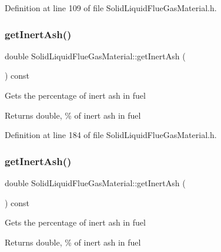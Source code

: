 Definition at line 109 of file Solid\+Liquid\+Flue\+Gas\+Material.\+h.

\mbox{\label{class_solid_liquid_flue_gas_material_a0549b32b7b5423267d5f59cc96b98127}} 
\subsubsection{\texorpdfstring{get\+Inert\+Ash()}{getInertAsh()}\hspace{0.1cm}{\footnotesize\ttfamily [1/3]}}
{\footnotesize\ttfamily double Solid\+Liquid\+Flue\+Gas\+Material\+::get\+Inert\+Ash (\begin{DoxyParamCaption}{ }\end{DoxyParamCaption}) const\hspace{0.3cm}{\ttfamily [inline]}}

Gets the percentage of inert ash in fuel \begin{DoxyReturn}{Returns}
double, \% of inert ash in fuel 
\end{DoxyReturn}


Definition at line 184 of file Solid\+Liquid\+Flue\+Gas\+Material.\+h.

\mbox{\label{class_solid_liquid_flue_gas_material_a0549b32b7b5423267d5f59cc96b98127}} 
\subsubsection{\texorpdfstring{get\+Inert\+Ash()}{getInertAsh()}\hspace{0.1cm}{\footnotesize\ttfamily [2/3]}}
{\footnotesize\ttfamily double Solid\+Liquid\+Flue\+Gas\+Material\+::get\+Inert\+Ash (\begin{DoxyParamCaption}{ }\end{DoxyParamCaption}) const\hspace{0.3cm}{\ttfamily [inline]}}

Gets the percentage of inert ash in fuel \begin{DoxyReturn}{Returns}
double, \% of inert ash in fuel 
\end{DoxyReturn}


